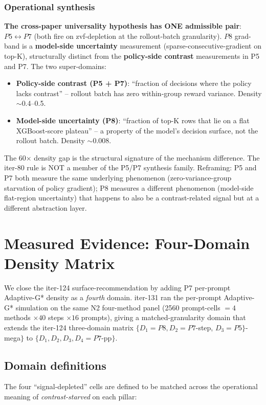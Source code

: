 \documentclass{article}
\begin{document}
\subsubsection{Operational synthesis}
\textbf{The cross-paper universality hypothesis has ONE admissible pair}:
$P5 \leftrightarrow P7$ (both fire on zvf-depletion at the rollout-batch
granularity).  $P8$ grad-band is a \textbf{model-side uncertainty}
measurement (sparse-consecutive-gradient on top-K), structurally
distinct from the \textbf{policy-side contrast} measurements in P5 and P7.
The two super-domains:
\begin{itemize}
\item \textbf{Policy-side contrast (P5 + P7)}: ``fraction of decisions where
the policy lacks contrast'' -- rollout batch has zero within-group reward
variance.  Density $\sim$0.4--0.5.
\item \textbf{Model-side uncertainty (P8)}: ``fraction of top-K rows that
lie on a flat XGBoost-score plateau'' -- a property of the model's
decision surface, not the rollout batch.  Density $\sim$0.008.
\end{itemize}
The 60$\times$ density gap is the structural signature of the
mechanism difference.  The iter-80 rule is NOT a member of the
P5/P7 synthesis family.  Reframing: P5 and P7 both measure the same
underlying phenomenon (zero-variance-group starvation of policy gradient);
P8 measures a different phenomenon (model-side flat-region uncertainty)
that happens to also be a contrast-related signal but at a different
abstraction layer. \section{Measured Evidence: Four-Domain Density Matrix}
\label{sec:synth-four-domain}

We close the iter-124 surface-recommendation by adding P7 per-prompt
Adaptive-G* density as a \emph{fourth} domain. iter-131 ran the
per-prompt Adaptive-G* simulation on the same N2 four-method panel
(\num{2560} prompt-cells $= 4$ methods $\times 40$ steps $\times
16$ prompts), giving a matched-granularity domain that extends the
iter-124 three-domain matrix $\{D_1{=}P8, D_2{=}P7$-step,
$D_3{=}P5\}$-mega$\}$ to $\{D_1, D_2, D_3, D_4{=}P7$-pp$\}$.

\subsection{Domain definitions}

The four ``signal-depleted'' cells are defined to be matched across the
operational meaning of \emph{contrast-starved} on each pillar:
\end{document}
